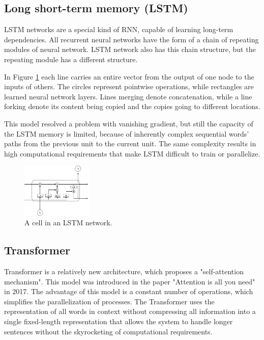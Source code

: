 \subsection{Long short-term memory (LSTM)} 
LSTM networks are a special kind of RNN, capable of learning long-term dependencies. All recurrent neural networks have the form of a chain of repeating modules of neural network. LSTM network also has this chain structure, but the repeating module has a different structure. 

In Figure \ref{lstm} each line carries an entire vector from the output of one node to the inputs of others. The circles represent pointwise operations, while rectangles are learned neural network layers. Lines merging denote concatenation, while a line forking denote its content being copied and the copies going to different locations.

This model resolved a problem with vanishing gradient, but still the capacity of the LSTM memory is limited, because of inherently complex sequential words' paths from the previous unit to the current unit. The same complexity results in high computational requirements that make LSTM difficult to train or parallelize.

\begin{figure}[hbt]
  \centering
  \includegraphics[width=0.3\textwidth]{figures/lstm.jpg}
  \caption{A cell in an LSTM network.}
  \label{lstm}
\end{figure}


\subsection{Transformer} 
Transformer is a relatively new architecture, which proposes a "self-attention mechanism". This model was introduced in the paper "Attention is all you need" \cite{transformer} in 2017. The advantage of this model is a constant number of operations, which simplifies the parallelization of processes. The Transformer uses the representation of all words in context without compressing all information into a single fixed-length representation that allows the system to handle longer sentences without the skyrocketing of computational requirements. 

